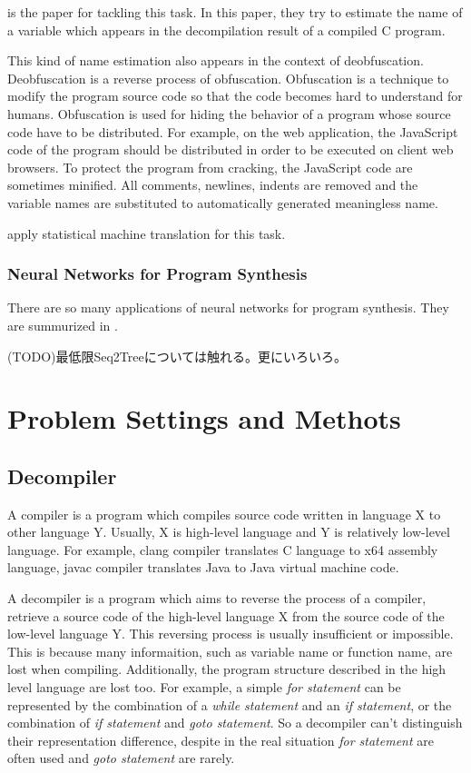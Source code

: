 \documentclass[senior,final,11pt]{iscs-thesis}
\begin{document}
\cite{name_recover_from_decompile_result} is the paper for tackling this task. 
In this paper, they try to estimate the name of a variable which appears in the decompilation result of a compiled C program.

This kind of name estimation also appears in the context of deobfuscation.
Deobfuscation is a reverse process of obfuscation.
Obfuscation is a technique to modify the program source code so that the code becomes hard to understand for humans. 
Obfuscation is used for hiding the behavior of a program whose source code have to be distributed.
For example, on the web application, the JavaScript code of the program should be distributed in order to be executed on client web browsers.
To protect the program from cracking, the JavaScript code are sometimes minified. All comments, newlines, indents are removed and the 
variable names are substituted to automatically generated meaningless name.

\cite{JSNaughty} apply statistical machine translation for this task. 

\subsection{Neural Networks for Program Synthesis}

There are so many applications of neural networks for program synthesis. They are summurized in \cite{deep_programming_matome}.

(TODO)最低限Seq2Treeについては触れる。更にいろいろ。

\chapter{Problem Settings and Methots}

\section{Decompiler}


A compiler is a program which compiles source code written in language X to other language Y. 
Usually, X is high-level language and Y is relatively low-level language. 
For example, clang compiler translates C language to x64 assembly language, javac compiler translates Java to Java virtual machine code.

A decompiler is a program which aims to reverse the process of a compiler, retrieve a source code of the high-level language X from the source code of the low-level language Y. 
This reversing process is usually insufficient or impossible.
This is because many informaition, such as variable name or function name, are lost when compiling.
Additionally, the program structure described in the high level language are lost too. 
For example, a simple {\sl for statement} can be represented by the combination of a {\sl while statement} and an {\sl if statement}, or the combination of {\sl if statement} and {\sl goto statement}. 
So a decompiler can't distinguish their representation difference, despite in the real situation {\sl for statement} are often used and {\sl goto statement} are rarely. 
\end{document}
